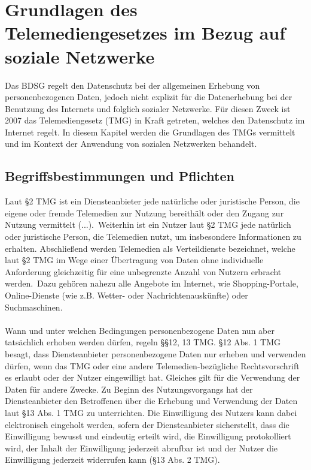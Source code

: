 \chapter{Grundlagen des Telemediengesetzes im Bezug auf soziale Netzwerke}
Das BDSG regelt den Datenschutz bei der allgemeinen Erhebung von personenbezogenen Daten, jedoch nicht explizit für die Datenerhebung bei der Benutzung des Internets und folglich sozialer Netzwerke. Für diesen Zweck ist 2007 das Telemediengesetz (\acs{TMG}) in Kraft getreten, welches den Datenschutz im Internet regelt.\autocite[vgl.][]{klicksafe.de} \autocite[vgl.][]{shr.de} In diesem Kapitel werden die Grundlagen des TMGs vermittelt und im Kontext der Anwendung von sozialen Netzwerken behandelt.
\section{Begriffsbestimmungen und Pflichten}
Laut \S 2 TMG ist ein Diensteanbieter \glqq jede natürliche oder juristische Person, die eigene oder fremde Telemedien zur Nutzung bereithält oder den Zugang zur Nutzung vermittelt (...).\grqq \ Weiterhin ist ein Nutzer laut \S 2 TMG jede natürlich oder juristische Person, die Telemedien nutzt, um insbesondere Informationen zu erhalten. Abschließend werden Telemedien als Verteildienste bezeichnet, welche laut \S 2 TMG \glqq im Wege einer Übertragung von Daten ohne individuelle Anforderung gleichzeitig für eine unbegrenzte Anzahl von Nutzern erbracht werden.\grqq \ Dazu gehören nahezu alle Angebote im Internet, wie Shopping-Portale, Online-Dienste (wie z.B. Wetter- oder Nachrichtenauskünfte) oder Suchmaschinen.\autocite[vgl.][]{shr.de}\\
\\Wann und unter welchen Bedingungen personenbezogene Daten nun aber tatsächlich erhoben werden dürfen, regeln \S\S 12, 13 TMG.  \S 12 Abs. 1 TMG besagt, dass Diensteanbieter personenbezogene Daten nur erheben und verwenden dürfen, wenn das TMG oder eine andere Telemedien-bezügliche Rechtsvorschrift es erlaubt oder der Nutzer eingewilligt hat. Gleiches gilt für die Verwendung der Daten für andere Zwecke. Zu Beginn des Nutzungsvorgangs hat der Diensteanbieter den Betroffenen über die Erhebung und Verwendung der Daten laut \S 13 Abs. 1 TMG zu unterrichten. Die Einwilligung des Nutzers kann dabei elektronisch eingeholt werden, sofern der Diensteanbieter sicherstellt, dass die Einwilligung bewusst und eindeutig erteilt wird, die Einwilligung protokolliert wird, der Inhalt der Einwilligung jederzeit abrufbar ist und der Nutzer die Einwilligung jederzeit widerrufen kann (\S 13 Abs. 2 TMG).
